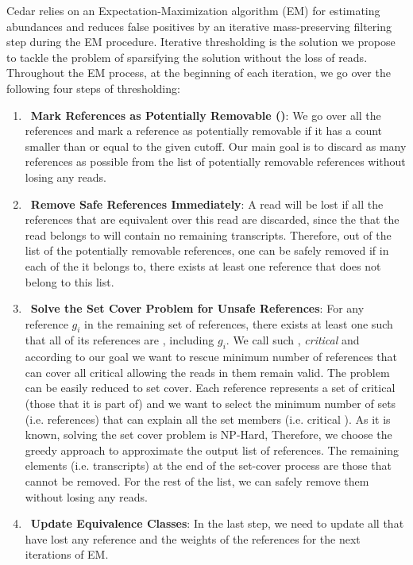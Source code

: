 Cedar relies on an Expectation-Maximization algorithm (EM) for estimating abundances
and reduces false positives by an iterative mass-preserving filtering step during the EM procedure.
Iterative thresholding is the solution we propose to tackle the problem of
sparsifying the solution without the loss of reads.
Throughout the EM process, at the beginning of each iteration,
we go over the following four steps of thresholding:
\begin{enumerate}
    \item~\textbf{Mark References as Potentially Removable (\abpt)}:
    We go over all the references and mark a reference as potentially removable
    if it has a count smaller than or equal to the given cutoff.
    Our main goal is to discard as many references as possible
    from the list of potentially removable references without losing any reads.
    \item~\textbf{Remove Safe \abpt References Immediately}:
    A read will be lost if all the references that are equivalent over this read are discarded,
    since the \eq that the read belongs to will contain no remaining transcripts.
    Therefore, out of the list of the potentially removable references,
    one can be safely removed if in each of the \eqs it belongs to, there exists at least one reference
    that does not belong to this list.
    \item~\textbf{Solve the Set Cover Problem for Unsafe \abpt References}:
    For any reference $g_i$ in the remaining set of \abpt references,
    there exists at least one \eq such that all of its references are \abpt, including $g_i$.
    We call such \eqs, \textit{critical \eqs} and according to our goal
    we want to rescue minimum number of \abpt references that can cover all critical \eqs
    allowing the reads in them remain valid.
    The problem can be easily reduced to set cover.
    Each reference represents a set of critical \eqs (those that it is part of)
    and we want to select the minimum number of sets (i.e. references)
    that can explain all the set members (i.e. critical \eqs).
    As it is known, solving the set cover problem is NP-Hard,
    Therefore, we choose the greedy approach to approximate the output list of references.
    The remaining elements (i.e. transcripts) at the end of the set-cover process are those that cannot be removed.
    For the rest of the list, we can safely remove them without losing any reads.
    \item~\textbf{Update Equivalence Classes}:
    In the last step, we need to update all \eqs that have lost any reference
    and the weights of the references for the next iterations of EM.
\end{enumerate}

